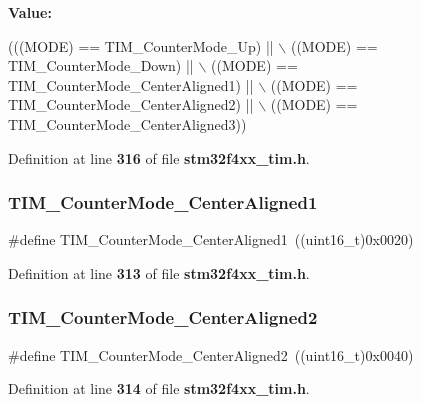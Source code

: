 {\bfseries Value\+:}
\begin{DoxyCode}
(((MODE) == TIM_CounterMode_Up) ||  \(\backslash\)
                                   ((MODE) == TIM_CounterMode_Down) || \(\backslash\)
                                   ((MODE) == TIM_CounterMode_CenterAligned1) || \(\backslash\)
                                   ((MODE) == TIM_CounterMode_CenterAligned2) || \(\backslash\)
                                   ((MODE) == TIM_CounterMode_CenterAligned3))
\end{DoxyCode}


Definition at line \textbf{ 316} of file \textbf{ stm32f4xx\+\_\+tim.\+h}.

\mbox{\label{group__TIM__Counter__Mode_gac07392e9637f8a0d115d4ba9a002ae93}} 
\subsubsection{T\+I\+M\+\_\+\+Counter\+Mode\+\_\+\+Center\+Aligned1}
{\footnotesize\ttfamily \#define T\+I\+M\+\_\+\+Counter\+Mode\+\_\+\+Center\+Aligned1~((uint16\+\_\+t)0x0020)}



Definition at line \textbf{ 313} of file \textbf{ stm32f4xx\+\_\+tim.\+h}.

\mbox{\label{group__TIM__Counter__Mode_ga3793122e4c123a99e46fc2f04acea0d4}} 
\subsubsection{T\+I\+M\+\_\+\+Counter\+Mode\+\_\+\+Center\+Aligned2}
{\footnotesize\ttfamily \#define T\+I\+M\+\_\+\+Counter\+Mode\+\_\+\+Center\+Aligned2~((uint16\+\_\+t)0x0040)}



Definition at line \textbf{ 314} of file \textbf{ stm32f4xx\+\_\+tim.\+h}.

